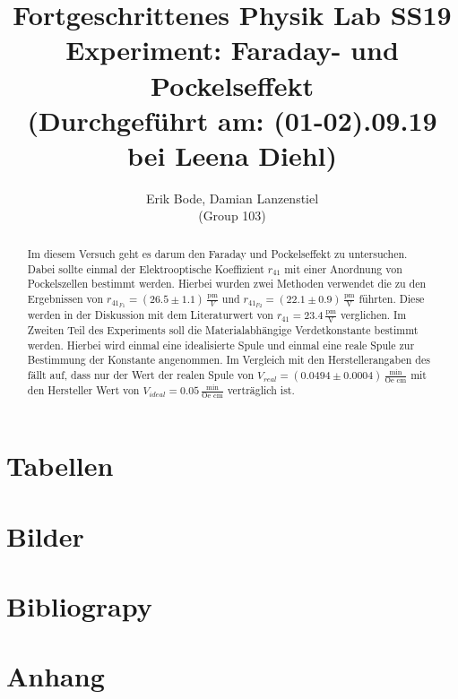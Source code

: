 \documentclass[30pt,a4paper]{article}
\title{
	\large Fortgeschrittenes Physik Lab	SS19 \\[4mm]
	\textbf{\LARGE Experiment: Faraday- und Pockelseffekt
	} \\[4mm]
	(Durchgeführt am: (01-02).09.19 bei Leena Diehl) \\}
\author{Erik Bode, Damian Lanzenstiel \\ (Group 103)}
\begin{document}
	
	\begin{titlepage}
		\maketitle
		\vspace{2cm}
		\begin{abstract}
		Im diesem Versuch geht es darum den Faraday und Pockelseffekt zu untersuchen. Dabei sollte einmal der Elektrooptische Koeffizient $r_{41}$ mit einer Anordnung von Pockelszellen bestimmt werden. Hierbei wurden zwei Methoden verwendet die zu den Ergebnissen von $r_{41_{F1}}=(26.5\pm1.1)\,\frac{\text{pm}}{V}$ und $r_{41_{F2}}=(22.1\pm 0.9)\,\frac{\text{pm}}{\text{V}}$ führten. Diese werden in der Diskussion mit dem Literaturwert von $r_{41}=23.4\,\frac{\text{pm}}{\text{V}}$ verglichen. Im Zweiten Teil des Experiments soll die Materialabhängige Verdetkonstante bestimmt werden. Hierbei wird einmal eine idealisierte Spule und einmal eine reale Spule zur Bestimmung der Konstante angenommen. 
		Im Vergleich mit den Herstellerangaben des fällt auf, dass nur der Wert der realen Spule von $V_{real}=(0.0494 \pm 0.0004)\,\frac{\text{min}}{\text{Oe cm}}$ mit den Hersteller Wert von $V_{ideal}=0.05\,\frac{\text{min}}{\text{Oe cm}}$  verträglich ist.
		\end{abstract}
	\end{titlepage}
	\newpage
	\tableofcontents
	\newpage
	
	
		
	
	
	
	
	
	
	\section{Tabellen}
	\listoftables
	\section{Bilder}
	\listoffigures
	\section{Bibliograpy}
	
	
	\section{Anhang}
	
\end{document}
